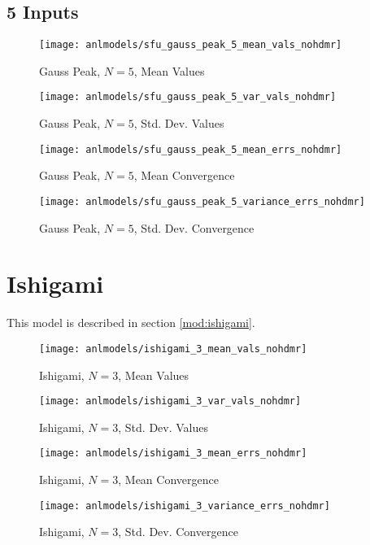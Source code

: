 \subsection{5 Inputs}
\begin{figure}[H]
  \centering
  \texttt{[image: anlmodels/sfu\_gauss\_peak\_5\_mean\_vals\_nohdmr]}
  \caption{Gauss Peak, $N=5$, Mean Values}
  \label{fig:gauss peak mean values 5}
\end{figure}
\begin{figure}[H]
  \centering
  \texttt{[image: anlmodels/sfu\_gauss\_peak\_5\_var\_vals\_nohdmr]}
  \caption{Gauss Peak, $N=5$, Std. Dev. Values}
  \label{fig:gauss peak var values 5}
\end{figure}

\begin{figure}[H]
  \centering
  \texttt{[image: anlmodels/sfu\_gauss\_peak\_5\_mean\_errs\_nohdmr]}
  \caption{Gauss Peak, $N=5$, Mean Convergence}
  \label{fig:gauss peak mean errors 5}
\end{figure}
\begin{figure}[H]
  \centering
  \texttt{[image: anlmodels/sfu\_gauss\_peak\_5\_variance\_errs\_nohdmr]}
  \caption{Gauss Peak, $N=5$, Std. Dev. Convergence}
  \label{fig:gauss peak var errors 5}
\end{figure}




\section{Ishigami}
This model is described in section \ref{mod:ishigami}.
\begin{figure}[H]
  \centering
  \texttt{[image: anlmodels/ishigami\_3\_mean\_vals\_nohdmr]}
  \caption{Ishigami, $N=3$, Mean Values}
  \label{fig:ishigami mean values 3}
\end{figure}
\begin{figure}[H]
  \centering
  \texttt{[image: anlmodels/ishigami\_3\_var\_vals\_nohdmr]}
  \caption{Ishigami, $N=3$, Std. Dev. Values}
  \label{fig:ishigami var values 3}
\end{figure}

\begin{figure}[H]
  \centering
  \texttt{[image: anlmodels/ishigami\_3\_mean\_errs\_nohdmr]}
  \caption{Ishigami, $N=3$, Mean Convergence}
  \label{fig:ishigami mean errors 3}
\end{figure}
\begin{figure}[H]
  \centering
  \texttt{[image: anlmodels/ishigami\_3\_variance\_errs\_nohdmr]}
  \caption{Ishigami, $N=3$, Std. Dev. Convergence}
  \label{fig:ishigami var errors 3}
\end{figure}


